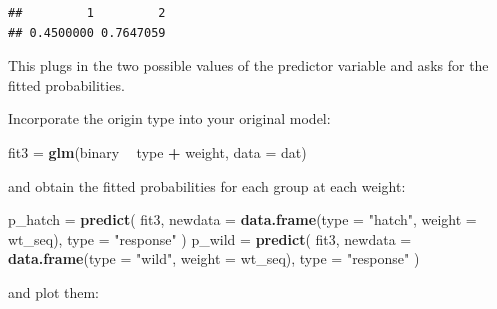 \documentclass[]{book}
\newenvironment{Shaded}{\begin{snugshade}}{\end{snugshade}}
\newcommand{\KeywordTok}[1]{\textcolor[rgb]{0.13,0.29,0.53}{\textbf{#1}}}
\newcommand{\DataTypeTok}[1]{\textcolor[rgb]{0.13,0.29,0.53}{#1}}
\newcommand{\DecValTok}[1]{\textcolor[rgb]{0.00,0.00,0.81}{#1}}
\newcommand{\StringTok}[1]{\textcolor[rgb]{0.31,0.60,0.02}{#1}}
\newcommand{\OperatorTok}[1]{\textcolor[rgb]{0.81,0.36,0.00}{\textbf{#1}}}
\newcommand{\NormalTok}[1]{#1}
\theoremstyle{definition}
\theoremstyle{definition}
\theoremstyle{definition}
\theoremstyle{remark}
\begin{document}
\begin{verbatim}
##         1         2 
## 0.4500000 0.7647059
\end{verbatim}

This plugs in the two possible values of the predictor variable and asks
for the fitted probabilities.

Incorporate the origin type into your original model:

\begin{Shaded}
\begin{Highlighting}[]
\NormalTok{fit3 =}\StringTok{ }\KeywordTok{glm}\NormalTok{(binary }\OperatorTok{~}\StringTok{ }\NormalTok{type }\OperatorTok{+}\StringTok{ }\NormalTok{weight, }\DataTypeTok{data =}\NormalTok{ dat)}
\end{Highlighting}
\end{Shaded}

and obtain the fitted probabilities for each group at each weight:

\begin{Shaded}
\begin{Highlighting}[]
\NormalTok{p_hatch =}\StringTok{ }\KeywordTok{predict}\NormalTok{(}
\NormalTok{  fit3, }\DataTypeTok{newdata =} \KeywordTok{data.frame}\NormalTok{(}\DataTypeTok{type =} \StringTok{"hatch"}\NormalTok{, }\DataTypeTok{weight =}\NormalTok{ wt_seq),}
  \DataTypeTok{type =} \StringTok{"response"}
\NormalTok{)}
\NormalTok{p_wild =}\StringTok{ }\KeywordTok{predict}\NormalTok{(}
\NormalTok{  fit3, }\DataTypeTok{newdata =} \KeywordTok{data.frame}\NormalTok{(}\DataTypeTok{type =} \StringTok{"wild"}\NormalTok{, }\DataTypeTok{weight =}\NormalTok{ wt_seq),}
  \DataTypeTok{type =} \StringTok{"response"}
\NormalTok{)}
\end{Highlighting}
\end{Shaded}

and plot them:

\begin{Shaded}
\end{Shaded}
\end{document}
